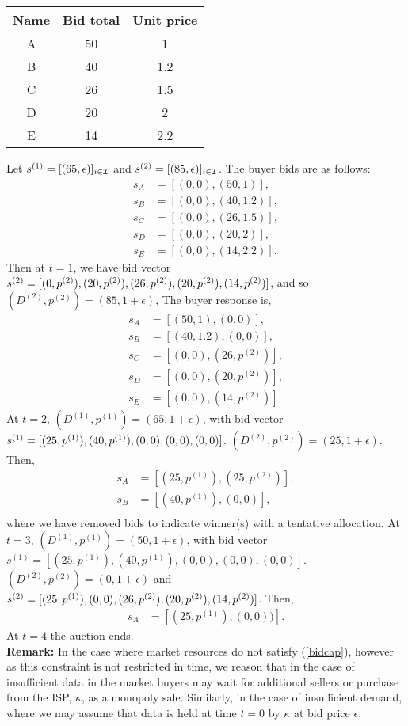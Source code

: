 \begin{center}
\begin{tabular}{c|c|c}
Name & Bid total & Unit price\\
\hline
A & 50 & 1\\ 
B & 40 & 1.2\\
C & 26 & 1.5\\
D & 20 & 2\\
E & 14 & 2.2
\end{tabular}
\end{center}
Let $s^{(1)} = [(65,\epsilon)]_{i\in\mathcal{I}}$ and
$s^{(2)}=[(85,\epsilon)]_{i\in\mathcal{I}}$. The buyer bids are as follows: 
\begin{align*}
    s_A &= [(0,0), (50,1)], \\
    s_B &= [(0,0), (40,1.2)], \\
    s_C &= [(0,0),(26,1.5)], \\
    s_D &= [(0,0),(20,2)], \\
    s_E &= [(0,0), (14,2.2)]. 
\end{align*}
Then at $t=1$, we have 
bid vector $s^{(2)}=[(0,p^{(2)}), (20,p^{(2)}), (26,p^{(2)}),\\ (20,p^{(2)}),
(14,p^{(2)})]$, and so  $(D^{(2)},p^{(2)}) = (85, 1+\epsilon)$, The buyer response is,
\begin{align*}
    s_A &= [(50,1), (0,0)], \\
    s_B &= [(40,1.2), (0,0)], \\
    s_C &= [(0,0),(26,p^{(2)})], \\
    s_D &= [(0,0),(20,p^{(2)})], \\
    s_E &= [(0,0),(14,p^{(2)})].
\end{align*}
At $t=2$, $(D^{(1)},p^{(1)}) = (65,1+\epsilon)$, with
bid vector $s^{(1)}=[(25,p^{(1)}),\\ (40,p^{(1)}), (0,0), (0,0),
(0,0)]$. $(D^{(2)},p^{(2)}) = (25, 1+\epsilon)$. Then,
\begin{align*}
    s_A &= [(25,p^{(1)}), (25,p^{(2)})], \\
    s_B &= [(40,p^{(1)}), (0,0)], \\
\end{align*}
where we have removed bids to indicate winner(s) with a tentative allocation.
At $t=3$, $(D^{(1)},p^{(1)}) = (50,1+\epsilon)$, with
bid vector $s^{(1)}=[(25,p^{(1)}), (40,p^{(1)}), (0,0), (0,0),
(0,0)]$. $(D^{(2)},p^{(2)}) = (0, 1+\epsilon)$ and $s^{(2)}=[(25,p^{(1)}),
(0,0), (26,p^{(2)}), (20,p^{(2)}),\\(14,p^{(2)})]$. Then,
\begin{align*}
    s_A &= [(25,p^{(1)}), (0,0))].
\end{align*}
At $t=4$ the auction ends.\\
\textbf{Remark:} In the case where market resources do not satisfy (\ref{bidcap}), however as
this constraint is not restricted in time, we reason that in the case of
insufficient data in the market buyers may wait for additional sellers or
purchase from the ISP, $\kappa$, as a monopoly sale. Similarly, in
the case of insufficient demand, where we may assume that data is held at time
$t=0$ by $\kappa$ at bid price $\epsilon$.





